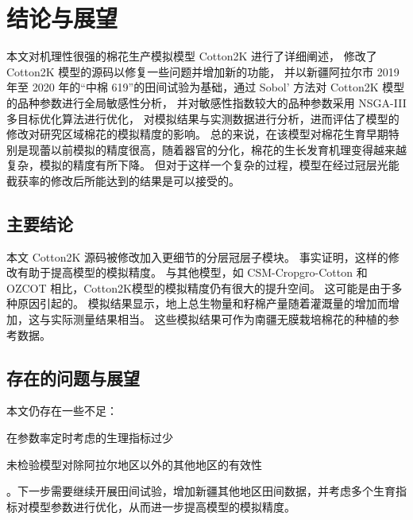 \chapter{结论与展望}
本文对机理性很强的棉花生产模拟模型 Cotton2K 进行了详细阐述，%
修改了 Cotton2K 模型的源码以修复一些问题并增加新的功能，%
并以新疆阿拉尔市 2019年至 2020 年的“中棉 619”的田间试验为基础，通过 Sobol' 方法对 Cotton2K 模型的品种参数进行全局敏感性分析，%
并对敏感性指数较大的品种参数采用 NSGA-III 多目标优化算法进行优化，%
对模拟结果与实测数据进行分析，进而评估了模型的修改对研究区域棉花的模拟精度的影响。%
总的来说，在该模型对棉花生育早期特别是现蕾以前模拟的精度很高，随着器官的分化，棉花的生长发育机理变得越来越复杂，模拟的精度有所下降。%
但对于这样一个复杂的过程，模型在经过冠层光能截获率的修改后所能达到的结果是可以接受的。%

\section{主要结论}

本文 Cotton2K 源码被修改加入更细节的分层冠层子模块。%
事实证明，这样的修改有助于提高模型的模拟精度。
与其他模型，如 CSM-Cropgro-Cotton 和 OZCOT 相比，Cotton2K模型的模拟精度仍有很大的提升空间。%
这可能是由于多种原因引起的。%
模拟结果显示，地上总生物量和籽棉产量随着灌溉量的增加而增加，这与实际测量结果相当。%
这些模拟结果可作为南疆无膜栽培棉花的种植的参考数据。

\section{存在的问题与展望}

本文仍存在一些不足：
\begin{enumerate*}
    \item 在参数率定时考虑的生理指标过少
    \item 未检验模型对除阿拉尔地区以外的其他地区的有效性
\end{enumerate*}。下一步需要继续开展田间试验，增加新疆其他地区田间数据，并考虑多个生育指标对模型参数进行优化，从而进一步提高模型的模拟精度。